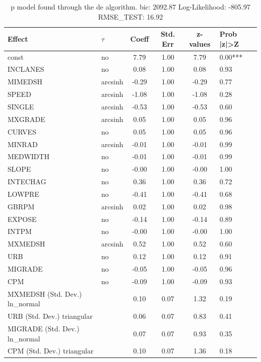 \begin{table}
	\caption{p model found through the de algorithm. bic: 2092.87 Log-Likelihood: -805.97 RMSE_TEST: 16.92}
	\begin{center}
		\begin{tabular}{|l|l|c|c|c|l|}
			\hline
			Effect & $\tau$ & Coeff & Std. Err & z-values & Prob |z|>Z \\
			\hline
			const & no & 7.79 & 1.00 & 7.79 & 0.00*** \\
			\hline
			INCLANES & no & 0.08 & 1.00 & 0.08 & 0.93 \\
			\hline
			MIMEDSH & arcsinh & -0.29 & 1.00 & -0.29 & 0.77 \\
			\hline
			SPEED & arcsinh & -1.08 & 1.00 & -1.08 & 0.28 \\
			\hline
			SINGLE & arcsinh & -0.53 & 1.00 & -0.53 & 0.60 \\
			\hline
			MXGRADE & arcsinh & 0.05 & 1.00 & 0.05 & 0.96 \\
			\hline
			CURVES & no & 0.05 & 1.00 & 0.05 & 0.96 \\
			\hline
			MINRAD & arcsinh & -0.01 & 1.00 & -0.01 & 0.99 \\
			\hline
			MEDWIDTH & no & -0.01 & 1.00 & -0.01 & 0.99 \\
			\hline
			SLOPE & no & -0.00 & 1.00 & -0.00 & 1.00 \\
			\hline
			INTECHAG & no & 0.36 & 1.00 & 0.36 & 0.72 \\
			\hline
			LOWPRE & no & -0.41 & 1.00 & -0.41 & 0.68 \\
			\hline
			GBRPM & arcsinh & 0.02 & 1.00 & 0.02 & 0.98 \\
			\hline
			EXPOSE & no & -0.14 & 1.00 & -0.14 & 0.89 \\
			\hline
			INTPM & no & -0.00 & 1.00 & -0.00 & 1.00 \\
			\hline
			MXMEDSH & arcsinh & 0.52 & 1.00 & 0.52 & 0.60 \\
			\hline
			URB & no & 0.12 & 1.00 & 0.12 & 0.91 \\
			\hline
			MIGRADE & no & -0.05 & 1.00 & -0.05 & 0.96 \\
			\hline
			CPM & no & -0.09 & 1.00 & -0.09 & 0.93 \\
			\hline
			MXMEDSH (Std. Dev.) ln_normal &  & 0.10 & 0.07 & 1.32 & 0.19 \\
			\hline
			URB (Std. Dev.) triangular &  & 0.06 & 0.07 & 0.83 & 0.41 \\
			\hline
			MIGRADE (Std. Dev.) ln_normal &  & 0.07 & 0.07 & 0.93 & 0.35 \\
			\hline
			CPM (Std. Dev.) triangular &  & 0.10 & 0.07 & 1.36 & 0.18 \\
			\hline
		\end{tabular}
	\end{center}
\end{table}